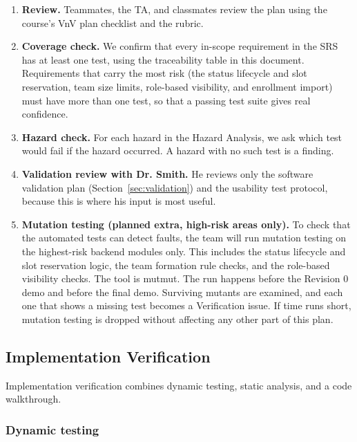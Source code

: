 \documentclass[12pt, titlepage]{article}
\begin{document}
  \begin{enumerate}
    \item \textbf{Review.} Teammates, the TA, and classmates review the plan using the course's VnV plan
    checklist and the rubric.
    \item \textbf{Coverage check.} We confirm that every in-scope requirement in the SRS has at least one test,
    using the traceability table in this document. Requirements that carry the
    most risk (the status lifecycle and slot reservation, team size limits, role-based visibility,
    and enrollment import) must have more than one test, so that a passing test suite gives real confidence.
    \item \textbf{Hazard check.} For each hazard in the Hazard Analysis, we ask which test would fail if
    the hazard occurred. A hazard with no such test is a finding.
    \item \textbf{Validation review with Dr. Smith.} He reviews only the software validation plan
    (Section~\ref{sec:validation}) and the usability test protocol, because this is where his input is most useful.
    \item \textbf{Mutation testing (planned extra, high-risk areas only).} To check that the automated tests
    can detect faults, the team will run mutation testing on the highest-risk backend modules only. This includes
    the status lifecycle and slot reservation logic, the team formation rule checks, and the role-based visibility checks.
    The tool is mutmut. The run happens before the Revision 0 demo and before the final demo.
    Surviving mutants are examined, and each one that shows a missing test becomes a Verification issue.
    If time runs short, mutation testing is dropped without affecting any other part of this plan.
  \end{enumerate}

  \subsection{Implementation Verification}
  \label{sec:impl-verification}

  Implementation verification combines dynamic testing, static analysis, and a code walkthrough.

  \subsubsection*{Dynamic testing}
\end{document}
